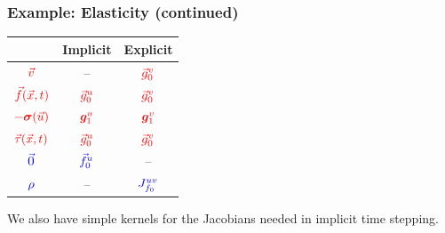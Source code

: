 \documentclass[aspectratio=169,hyperref=colorlinks]{beamer}
\newcommand{\lhs}[1]{{\color{blue}#1}}
\newcommand{\rhs}[1]{{\color{red}#1}}
\newcommand{\tensor}[1]{\bm{#1}}
\begin{document}
\begin{frame}
  \frametitle{Example: Elasticity (continued)}

  {\centering
  \begin{tabular}{ccc}
    & {\bf Implicit} & {\bf Explicit} \\ \hline
    $\rhs{\vec{v}}$   &   --   &   $\rhs{\vec{g}_0^v}$ \\
    $\rhs{\vec{f}(\vec{x},t)}$   &   $\rhs{\vec{g}_0^u}$   &   $\rhs{\vec{g}_0^v}$ \\
    $\rhs{-\tensor{\sigma}(\vec{u})}$   & $\rhs{\tensor{g}_1^u}$   &   $\rhs{\tensor{g}_1^v}$ \\
    $\rhs{\vec{\tau}(\vec{x},t)}$   &   $\rhs{\vec{g}_0^u}$   &   $\rhs{\vec{g}_0^v}$ \\
    $\lhs{\vec{0}}$   &   $\lhs{\vec{f}_0^u}$ & -- \\
    $\lhs{\rho}$ & -- & $\lhs{J_{f_0}^{uv}}$ \\
    \hline
  \end{tabular}\par}
  \vfill
  We also have simple kernels for the Jacobians needed in implicit time stepping.

\end{frame}
\end{document}
